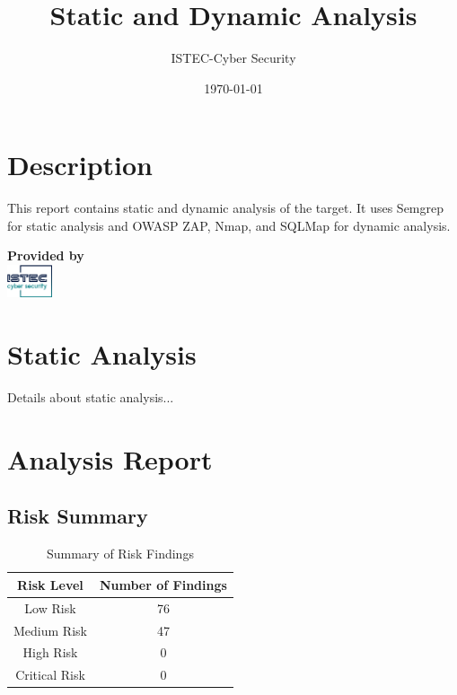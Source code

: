 \documentclass[12pt]{article}
\title{\textbf{Static and Dynamic Analysis}}
\author{ISTEC-Cyber Security}
\date{\today} %
\begin{document}
\maketitle

\section*{Description}
This report contains static and dynamic analysis of the target. It uses Semgrep for static analysis and OWASP ZAP, Nmap, and SQLMap for dynamic analysis.

\vspace{10cm} %

\begin{center}
\textbf{Provided by} \\[1em]
\includegraphics[width=0.1\textwidth]{logo75.png}
\end{center}

\newpage %

\section{Static Analysis}
Details about static analysis...

\section{Analysis Report}

\subsection{Risk Summary}
\begin{table}[h!]
\centering
\renewcommand{\arraystretch}{1.5}
\begin{tabular}{|c|c|}
\hline
\textbf{Risk Level} & \textbf{Number of Findings} \\
\hline
Low Risk & 76 \\ 
\hline
Medium Risk & 47 \\ 
\hline
High Risk & 0 \\ 
\hline
Critical Risk & 0 \\ 
\hline
\end{tabular}
\caption{Summary of Risk Findings}
\label{tab:risk_summary}
\end{table}
\end{document}
